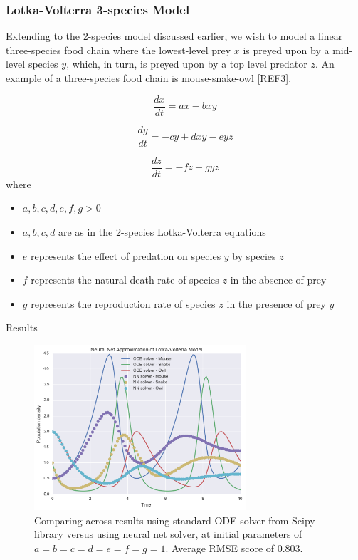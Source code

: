 \documentclass[11pt]{article}
\begin{document}
\subsubsection{Lotka-Volterra 3-species Model}
Extending to the 2-species model discussed earlier, we wish to model a linear three-species food chain where the lowest-level prey $x$ is preyed upon by a mid-level species $y$, which, in turn, is preyed upon by a top level predator $z$. An example of a three-species food chain is mouse-snake-owl [REF3].  

    \begin{equation}
      \frac{dx}{dt} = ax - bxy
      \label{eq:LV3}
    \end{equation}
    
     \begin{equation}
      \frac{dy}{dt} = - cy + dxy - eyz
      \label{eq:LV4}
    \end{equation}
    
     \begin{equation}
      \frac{dz}{dt} = - fz + gyz
      \label{eq:LV5}
    \end{equation}
where
\begin{itemize}
\item $a, b, c, d, e, f, g >0$ 
\item $a, b, c, d$ are as in the 2-species Lotka-Volterra equations
\item $e$ represents the effect of predation on species $y$ by species $z$
\item $f$ represents the natural death rate of species $z$ in the absence of prey
\item $g$ represents the reproduction rate of species $z$ in the presence of prey $y$
\end{itemize}

Results
\begin{figure}
\centering
\includegraphics[width=0.7\textwidth]{LV_Compare_3_species.png}
      \caption{Comparing across results using standard ODE solver from Scipy library versus using neural net solver, at initial parameters of $a = b = c = d = e = f = g = 1 $. Average RMSE score of 0.803. \label{fig:LVFig_3_species}}
\end{figure}
\end{document}
